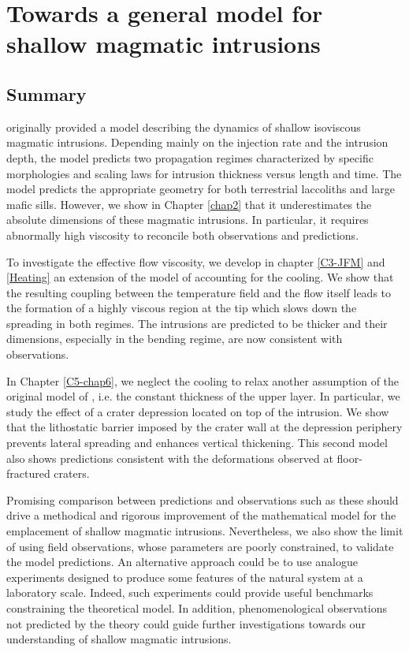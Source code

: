 \chapter[Towards a  model for  shallow magmatic  intrusions]{Towards a
  general model for shallow magmatic intrusions}
\label{chap7}
\minitoc

\section{Summary}
\label{sec:summary-2}

\citet{Michaut:2011kg}  originally  provided  a model  describing  the
dynamics of shallow isoviscous  magmatic intrusions.  Depending mainly
on the injection rate and the  intrusion depth, the model predicts two
propagation regimes characterized by specific morphologies and scaling
laws  for  intrusion thickness  versus  length  and time.   The  model
predicts the appropriate geometry  for both terrestrial laccoliths and
large mafic  sills. However,  we show in  Chapter \ref{chap2}  that it
underestimates   the    absolute   dimensions   of    these   magmatic
intrusions. In  particular, it  requires abnormally high  viscosity to
reconcile both observations and predictions.

To investigate  the effective  flow viscosity,  we develop  in chapter
\ref{C3-JFM}  and   \ref{Heating}  an   extension  of  the   model  of
\citet{Michaut:2011kg} accounting  for the cooling.  We  show that the
resulting coupling between  the temperature field and  the flow itself
leads to  the formation of  a highly viscous  region at the  tip which
slows  down  the  spreading  in  both  regimes.   The  intrusions  are
predicted  to  be thicker  and  their  dimensions, especially  in  the
bending regime, are now consistent with observations.

In Chapter  \ref{C5-chap6}, we  neglect the  cooling to  relax another
assumption of  the original model of  \citet{Michaut:2011kg}, i.e. the
constant thickness  of the  upper layer. In  particular, we  study the
effect of a crater depression located on top of the intrusion. We show
that  the  lithostatic barrier  imposed  by  the  crater wall  at  the
depression periphery prevents lateral  spreading and enhances vertical
thickening. This second model also shows predictions consistent with
the deformations observed at floor-fractured craters.

Promising  comparison between  predictions  and  observations such  as
these  should  drive a  methodical  and  rigorous improvement  of  the
mathematical model for the emplacement of shallow magmatic intrusions.
Nevertheless,  we also  show the  limit of  using field  observations,
whose  parameters  are  poorly  constrained,  to  validate  the  model
predictions.   An  alternative  approach  could  be  to  use  analogue
experiments designed to produce some  features of the natural system at
a  laboratory scale.   Indeed, such  experiments could  provide useful
benchmarks   constraining  the   theoretical   model.   In   addition,
phenomenological observations not predicted  by the theory could guide
further investigations  towards our understanding of  shallow magmatic
intrusions.

